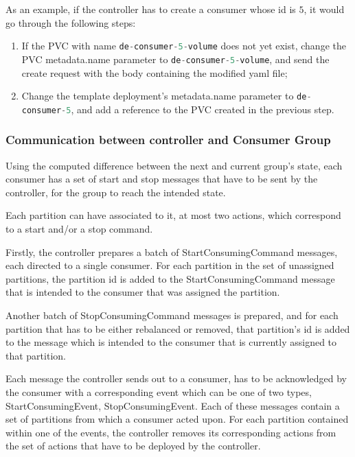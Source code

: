 As an example, if the controller has to create a consumer whose id is $5$, it would go through the following steps:
\begin{enumerate}
    \item If the PVC with name \lstinline[language=Python]{de-consumer-5-volume} does not yet exist, change the PVC metadata.name parameter to \lstinline[language=Python]{de-consumer-5-volume}, and send the create request with the body containing the modified yaml file;
    \item Change the template deployment's metadata.name parameter to \lstinline[language=Python]{de-consumer-5}, and add a reference to the PVC created in the previous step.
\end{enumerate}

\subsubsection{Communication between controller and Consumer Group}
\label{sub:controller_communication_cosumer}

Using the computed difference between the next and current group's state, each consumer has a set of start and stop messages that have to be sent by the controller, for the group to reach the intended state.

Each partition can have associated to it, at most two actions, which correspond to a start and/or a stop command. 

Firstly, the controller prepares a batch of StartConsumingCommand messages, each directed to a single consumer. For each partition in the set of unassigned partitions, the partition id is added to the StartConsumingCommand message that is intended to the consumer that was assigned the partition.

Another batch of StopConsumingCommand messages is prepared, and for each partition that has to be either rebalanced or removed, that partition's id is added to the message which is intended to the consumer that is currently assigned to that partition. 

Each message the controller sends out to a consumer, has to be acknowledged by the consumer with a corresponding event which can be one of two types, StartConsumingEvent, StopConsumingEvent. Each of these messages contain a set of partitions from which a consumer acted upon. For each partition contained within one of the events, the controller removes its corresponding actions from the set of actions that have to be deployed by the controller. 

